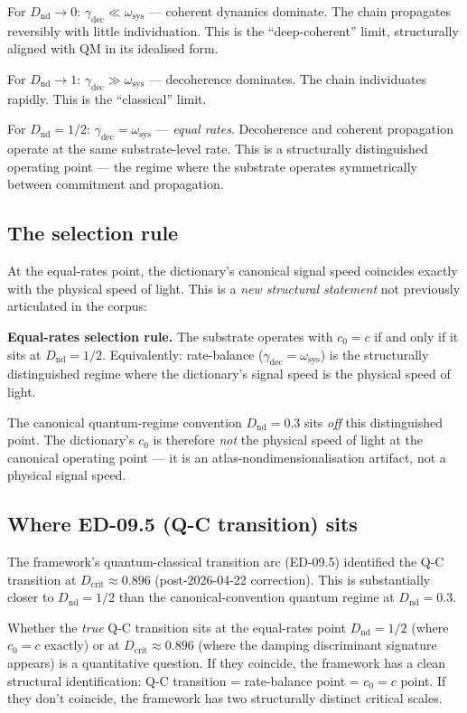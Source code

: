 \documentclass[11pt,a4paper]{article}
\begin{document}
For $D_\mathrm{nd} \to 0$: $\gamma_\mathrm{dec} \ll \omega_\mathrm{sys}$ --- coherent dynamics dominate. The chain propagates reversibly with little individuation. This is the ``deep-coherent'' limit, structurally aligned with QM in its idealised form.

For $D_\mathrm{nd} \to 1$: $\gamma_\mathrm{dec} \gg \omega_\mathrm{sys}$ --- decoherence dominates. The chain individuates rapidly. This is the ``classical'' limit.

For $D_\mathrm{nd} = 1/2$: $\gamma_\mathrm{dec} = \omega_\mathrm{sys}$ --- \emph{equal rates}. Decoherence and coherent propagation operate at the same substrate-level rate. This is a structurally distinguished operating point --- the regime where the substrate operates symmetrically between commitment and propagation.

\subsection{The selection rule}

At the equal-rates point, the dictionary's canonical signal speed coincides exactly with the physical speed of light. This is a \emph{new structural statement} not previously articulated in the corpus:

\textbf{Equal-rates selection rule.} The substrate operates with $c_0 = c$ if and only if it sits at $D_\mathrm{nd} = 1/2$. Equivalently: rate-balance ($\gamma_\mathrm{dec} = \omega_\mathrm{sys}$) is the structurally distinguished regime where the dictionary's signal speed is the physical speed of light.

The canonical quantum-regime convention $D_\mathrm{nd} = 0.3$ sits \emph{off} this distinguished point. The dictionary's $c_0$ is therefore \emph{not} the physical speed of light at the canonical operating point --- it is an atlas-nondimensionalisation artifact, not a physical signal speed.

\subsection{Where ED-09.5 (Q-C transition) sits}

The framework's quantum-classical transition arc (ED-09.5) identified the Q-C transition at $D_\mathrm{crit} \approx 0.896$ (post-2026-04-22 correction). This is substantially closer to $D_\mathrm{nd} = 1/2$ than the canonical-convention quantum regime at $D_\mathrm{nd} = 0.3$.

Whether the \emph{true} Q-C transition sits at the equal-rates point $D_\mathrm{nd} = 1/2$ (where $c_0 = c$ exactly) or at $D_\mathrm{crit} \approx 0.896$ (where the damping discriminant signature appears) is a quantitative question. If they coincide, the framework has a clean structural identification: Q-C transition = rate-balance point = $c_0 = c$ point. If they don't coincide, the framework has two structurally distinct critical scales.
\end{document}
